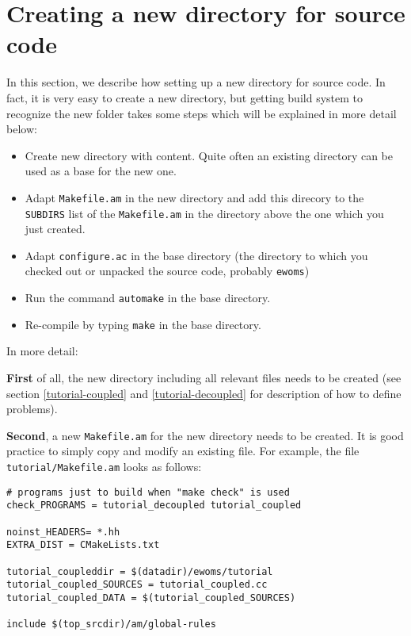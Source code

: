 \chapter{Creating a new directory for source code}

In this section, we describe how setting up a new directory for source
code. In fact, it is very easy to create a new directory, but getting
\Dune build system to recognize the new folder takes some steps which
will be explained in more detail below:

\begin{itemize}
\item Create new directory with content. Quite often an existing
  directory can be used as a base for the new one.
\item Adapt \texttt{Makefile.am} in the new directory and add this
  direcory to the \texttt{SUBDIRS} list of the \texttt{Makefile.am} in
  the directory above the one which you just created.
\item Adapt \texttt{configure.ac} in the \eWoms base directory (the
  directory to which you checked out or unpacked the \eWoms source
  code, probably \texttt{ewoms})
\item Run the command \texttt{automake} in the \eWoms base directory.
\item Re-compile \eWoms by typing \texttt{make} in the \eWoms base
  directory.
\end{itemize}

\noindent In more detail:

\textbf{First} of all, the new directory including all relevant files
needs to be created (see section \ref{tutorial-coupled} and
\ref{tutorial-decoupled} for description of how to define problems).

\textbf{Second}, a new \texttt{Makefile.am} for the new directory
needs to be created. It is good practice to simply copy and modify an
existing file. For example, the file \texttt{tutorial/Makefile.am}
looks as follows:
\begin{verbatim}
# programs just to build when "make check" is used
check_PROGRAMS = tutorial_decoupled tutorial_coupled

noinst_HEADERS= *.hh
EXTRA_DIST = CMakeLists.txt

tutorial_coupleddir = $(datadir)/ewoms/tutorial
tutorial_coupled_SOURCES = tutorial_coupled.cc
tutorial_coupled_DATA = $(tutorial_coupled_SOURCES)

include $(top_srcdir)/am/global-rules
\end{verbatim}

